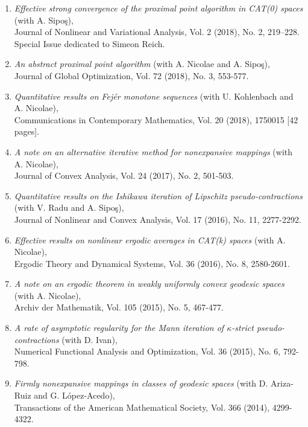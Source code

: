 \documentclass[12pt]{article}
\begin{document}
\begin{enumerate}
\item {\em Effective strong convergence of the proximal point algorithm in CAT(0) spaces}
  (with A. Sipo\c s), \\
 Journal of Nonlinear and Variational Analysis, Vol. 2 (2018), No. 2, 219--228.\\
 Special Issue dedicated to Simeon Reich.

\item {\em An abstract proximal point algorithm}
(with A. Nicolae and A. Sipo\c s), \\
Journal of Global Optimization, Vol. 72 (2018), No. 3, 553-577.

\item {\em Quantitative results on Fej\'{e}r monotone sequences} (with U. Kohlenbach and A. Nicolae),\\
Communications in Contemporary Mathematics, Vol.  20 (2018), 1750015 [42 pages].

\item {\em A note on an alternative iterative method for nonexpansive mappings} (with A. Nicolae),\\
Journal of Convex Analysis, Vol. 24 (2017), No. 2, 501-503.

\item {\em Quantitative results on the Ishikawa iteration of Lipschitz pseudo-contractions} 
(with V. Radu and A. Sipo\c s),\\ 
Journal of Nonlinear and Convex Analysis, Vol. 17 (2016), No. 11, 2277-2292.

\item {\em Effective results on nonlinear ergodic averages in CAT(k) spaces} (with A. Nicolae),\\
Ergodic Theory and Dynamical Systems, Vol.  36 (2016), No. 8, 2580-2601.

\item {\em A note on an ergodic theorem in weakly uniformly convex geodesic spaces} (with A. Nicolae),\\
Archiv der Mathematik, Vol. 105 (2015), No. 5, 467-477.

\item {\em A rate of asymptotic regularity for the Mann iteration of $\kappa$-strict pseudo-contractions} (with D. Ivan), \\
Numerical Functional Analysis and Optimization, Vol. 36 (2015), No. 6, 792-798.

\item {\em Firmly nonexpansive mappings in classes of geodesic spaces} (with D. Ariza-Ruiz and 
G. L\'opez-Acedo),\\
Transactions of the American Mathematical Society, Vol. 366 (2014), 4299-4322.


\end{enumerate}
\end{document}
